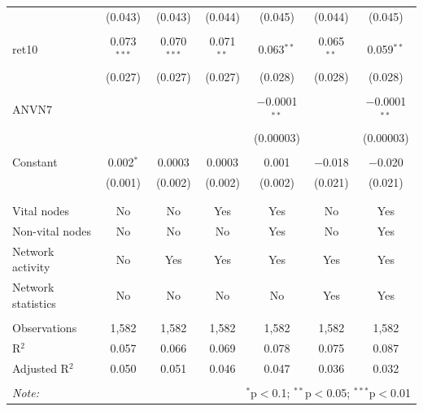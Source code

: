 \begin{table}[!htbp]
\begin{tabular}{@{\extracolsep{5pt}}lcccccc}
  & (0.043) & (0.043) & (0.044) & (0.045) & (0.044) & (0.045) \\ 
  & & & & & & \\ 
 ret10 & 0.073$^{***}$ & 0.070$^{***}$ & 0.071$^{**}$ & 0.063$^{**}$ & 0.065$^{**}$ & 0.059$^{**}$ \\ 
  & (0.027) & (0.027) & (0.027) & (0.028) & (0.028) & (0.028) \\ 
  & & & & & & \\ 
 ANVN7 &  &  &  & $-$0.0001$^{**}$ &  & $-$0.0001$^{**}$ \\ 
  &  &  &  & (0.00003) &  & (0.00003) \\ 
  & & & & & & \\ 
 Constant & 0.002$^{*}$ & 0.0003 & 0.0003 & 0.001 & $-$0.018 & $-$0.020 \\ 
  & (0.001) & (0.002) & (0.002) & (0.002) & (0.021) & (0.021) \\ 
  & & & & & & \\ 
\hline \\[-1.8ex] 
Vital nodes & No & No & Yes & Yes & No & Yes \\ 
Non-vital nodes & No & No & No & Yes & No & Yes \\ 
Network activity & No & Yes & Yes & Yes & Yes & Yes \\ 
Network statistics & No & No & No & No & Yes & Yes \\ 
\hline &  &  &  &  &  &  \\ 
Observations & 1,582 & 1,582 & 1,582 & 1,582 & 1,582 & 1,582 \\ 
R$^{2}$ & 0.057 & 0.066 & 0.069 & 0.078 & 0.075 & 0.087 \\ 
Adjusted R$^{2}$ & 0.050 & 0.051 & 0.046 & 0.047 & 0.036 & 0.032 \\ 
\hline 
\hline \\[-1.8ex] 
\textit{Note:}  & \multicolumn{6}{r}{$^{*}$p$<$0.1; $^{**}$p$<$0.05; $^{***}$p$<$0.01} \\ 
\end{tabular} 
\end{table} 
